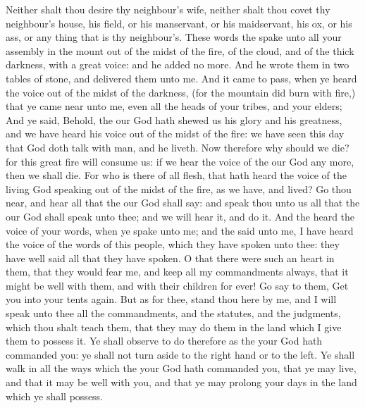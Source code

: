 \begin{biblechapter}
\verse Neither shalt thou desire thy neighbour's wife, neither shalt thou covet thy neighbour's house, his field, or his manservant, or his maidservant, his ox, or his ass, or any thing that is thy neighbour's.
\verse These words the \LORD spake unto all your assembly in the mount out of the midst of the fire, of the cloud, and of the thick darkness, with a great voice: and he added no more. And he wrote them in two tables of stone, and delivered them unto me.
\verse And it came to pass, when ye heard the voice out of the midst of the darkness, (for the mountain did burn with fire,) that ye came near unto me, even all the heads of your tribes, and your elders;
\verse And ye said, Behold, the \LORD our God hath shewed us his glory and his greatness, and we have heard his voice out of the midst of the fire: we have seen this day that God doth talk with man, and he liveth.
\verse Now therefore why should we die? for this great fire will consume us: if we hear the voice of the \LORD our God any more, then we shall die.
\verse For who is there of all flesh, that hath heard the voice of the living God speaking out of the midst of the fire, as we have, and lived?
\verse Go thou near, and hear all that the \LORD our God shall say: and speak thou unto us all that the \LORD our God shall speak unto thee; and we will hear it, and do it.
\verse And the \LORD heard the voice of your words, when ye spake unto me; and the \LORD said unto me, I have heard the voice of the words of this people, which they have spoken unto thee: they have well said all that they have spoken.
\verse O that there were such an heart in them, that they would fear me, and keep all my commandments always, that it might be well with them, and with their children for ever!
\verse Go say to them, Get you into your tents again.
\verse But as for thee, stand thou here by me, and I will speak unto thee all the commandments, and the statutes, and the judgments, which thou shalt teach them, that they may do them in the land which I give them to possess it.
\verse Ye shall observe to do therefore as the \LORD your God hath commanded you: ye shall not turn aside to the right hand or to the left.
\verse Ye shall walk in all the ways which the \LORD your God hath commanded you, that ye may live, and that it may be well with you, and that ye may prolong your days in the land which ye shall possess.
\end{biblechapter}

